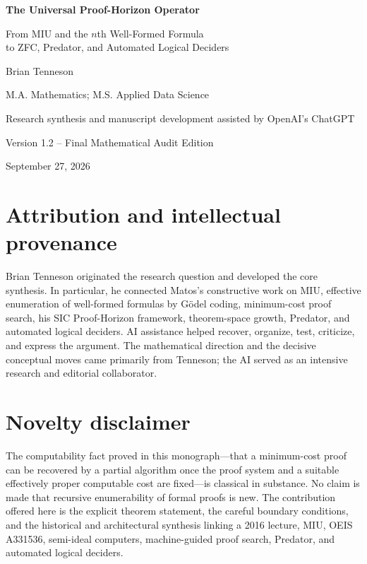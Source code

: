\documentclass[11pt,oneside]{book}
\theoremstyle{definition}
\theoremstyle{remark}
\begin{document}
\hypersetup{pageanchor=false}
\begin{titlepage}
\centering
\vspace*{1.0in}
{\Huge\bfseries The Universal Proof-Horizon Operator\par}
\vspace{0.35in}
{\Large From MIU and the $n$th Well-Formed Formula\\
to ZFC, Predator, and Automated Logical Deciders\par}
\vspace{0.8in}
{\Large Brian Tenneson\par}
\vspace{0.15in}
{\large M.A. Mathematics; M.S. Applied Data Science\par}
\vfill
{\large Research synthesis and manuscript development assisted by OpenAI's ChatGPT\par}
\vspace{0.25in}
{\large Version 1.2 -- Final Mathematical Audit Edition\par}
{\large September 27, 2026\par}
\end{titlepage}
\clearpage
\hypersetup{pageanchor=true}
\frontmatter

\chapter*{Attribution and intellectual provenance}
Brian Tenneson originated the research question and developed the core synthesis. In particular, he connected Matos's constructive work on MIU, effective enumeration of well-formed formulas by G\"odel coding, minimum-cost proof search, his SIC Proof-Horizon framework, theorem-space growth, Predator, and automated logical deciders. AI assistance helped recover, organize, test, criticize, and express the argument. The mathematical direction and the decisive conceptual moves came primarily from Tenneson; the AI served as an intensive research and editorial collaborator.

\chapter*{Novelty disclaimer}
The computability fact proved in this monograph---that a minimum-cost proof can be recovered by a partial algorithm once the proof system and a suitable effectively proper computable cost are fixed---is classical in substance. No claim is made that recursive enumerability of formal proofs is new. The contribution offered here is the explicit theorem statement, the careful boundary conditions, and the historical and architectural synthesis linking a 2016 lecture, MIU, OEIS A331536, semi-ideal computers, machine-guided proof search, Predator, and automated logical deciders.
\end{document}
